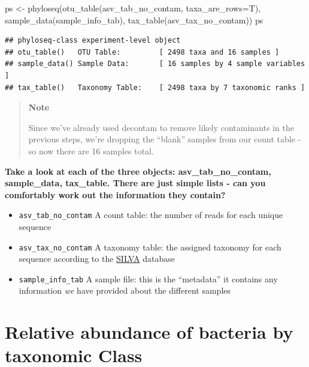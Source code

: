 \documentclass[
]{book}
\newenvironment{Shaded}{\begin{snugshade}}{\end{snugshade}}
\newcommand{\AttributeTok}[1]{\textcolor[rgb]{0.77,0.63,0.00}{#1}}
\newcommand{\FunctionTok}[1]{\textcolor[rgb]{0.00,0.00,0.00}{#1}}
\newcommand{\NormalTok}[1]{#1}
\newcommand{\OtherTok}[1]{\textcolor[rgb]{0.56,0.35,0.01}{#1}}
\begin{document}
\begin{Shaded}
\begin{Highlighting}[]
\NormalTok{ps }\OtherTok{\textless{}{-}} \FunctionTok{phyloseq}\NormalTok{(}\FunctionTok{otu\_table}\NormalTok{(asv\_tab\_no\_contam, }\AttributeTok{taxa\_are\_rows=}\NormalTok{T), }
               \FunctionTok{sample\_data}\NormalTok{(sample\_info\_tab), }
               \FunctionTok{tax\_table}\NormalTok{(asv\_tax\_no\_contam))}
\NormalTok{ps}
\end{Highlighting}
\end{Shaded}

\begin{verbatim}
## phyloseq-class experiment-level object
## otu_table()   OTU Table:         [ 2498 taxa and 16 samples ]
## sample_data() Sample Data:       [ 16 samples by 4 sample variables ]
## tax_table()   Taxonomy Table:    [ 2498 taxa by 7 taxonomic ranks ]
\end{verbatim}

\begin{quote}
\textbf{Note}

Since we've already used decontam to remove likely contaminants in the previous steps, we're dropping the ``blank'' samples from our count table - so now there are 16 samples total.
\end{quote}

\textbf{Take a look at each of the three objects: asv\_tab\_no\_contam, sample\_data, tax\_table. There are just simple lists - can you comfortably work out the information they contain?}

\begin{itemize}
\item
  \texttt{asv\_tab\_no\_contam} A count table: the number of reads for each unique sequence
\item
  \texttt{asv\_tax\_no\_contam} A taxonomy table: the assigned taxonomy for each sequence according to the \href{https://www.arb-silva.de/}{SILVA} database
\item
  \texttt{sample\_info\_tab} A sample file: this is the ``metadata'' it contains any information \emph{we} have provided about the different samples
\end{itemize}

\hypertarget{relative-abundance-of-bacteria-by-taxonomic-class}{%
\section{Relative abundance of bacteria by taxonomic Class}\label{relative-abundance-of-bacteria-by-taxonomic-class}}
\end{document}
